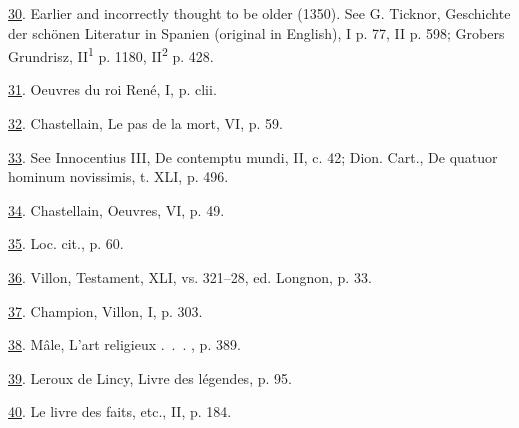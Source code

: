 \protect\hypertarget{23_NOTES.xhtmlux5cux23id_1293}{\protect\hyperlink{12_Chapter_Five__THE_VISION_OF_DEAT.xhtmlux5cux23id_1292}{30}}.
Earlier and incorrectly thought to be older (1350). See G. Ticknor,
Geschichte der schönen Literatur in Spanien (original in English), I p.
77, II p. 598; Grobers Grundrisz, II\textsuperscript{1} p. 1180,
II\textsuperscript{2} p. 428.

\protect\hypertarget{23_NOTES.xhtmlux5cux23id_1291}{\protect\hyperlink{12_Chapter_Five__THE_VISION_OF_DEAT.xhtmlux5cux23id_1290}{31}}.
Oeuvres du roi René, I, p. clii.

\protect\hypertarget{23_NOTES.xhtmlux5cux23id_1289}{\protect\hyperlink{12_Chapter_Five__THE_VISION_OF_DEAT.xhtmlux5cux23id_1288}{32}}.
Chastellain, Le pas de la mort, VI, p. 59.

\protect\hypertarget{23_NOTES.xhtmlux5cux23id_1287}{\protect\hyperlink{12_Chapter_Five__THE_VISION_OF_DEAT.xhtmlux5cux23id_1286}{33}}.
See Innocentius III, De contemptu mundi, II, c. 42; Dion. Cart., De
quatuor hominum novissimis, t. XLI, p. 496.

\protect\hypertarget{23_NOTES.xhtmlux5cux23id_1285}{\protect\hyperlink{12_Chapter_Five__THE_VISION_OF_DEAT.xhtmlux5cux23id_1284}{34}}.
Chastellain, Oeuvres, VI, p. 49.

\protect\hypertarget{23_NOTES.xhtmlux5cux23id_1283}{\protect\hyperlink{12_Chapter_Five__THE_VISION_OF_DEAT.xhtmlux5cux23id_1282}{35}}.
Loc. cit., p. 60.

\protect\hypertarget{23_NOTES.xhtmlux5cux23id_1281}{\protect\hyperlink{12_Chapter_Five__THE_VISION_OF_DEAT.xhtmlux5cux23id_1280}{36}}.
Villon, Testament, XLI, vs. 321--28, ed. Longnon, p. 33.

\protect\hypertarget{23_NOTES.xhtmlux5cux23id_1279}{\protect\hyperlink{12_Chapter_Five__THE_VISION_OF_DEAT.xhtmlux5cux23id_1278}{37}}.
Champion, Villon, I, p. 303.

\protect\hypertarget{23_NOTES.xhtmlux5cux23id_1277}{\protect\hyperlink{12_Chapter_Five__THE_VISION_OF_DEAT.xhtmlux5cux23id_1276}{38}}.
Mâle, L'art religieux .~.~. , p. 389.

\protect\hypertarget{23_NOTES.xhtmlux5cux23id_1275}{\protect\hyperlink{12_Chapter_Five__THE_VISION_OF_DEAT.xhtmlux5cux23id_1274}{39}}.
Leroux de Lincy, Livre des légendes, p. 95.

\protect\hypertarget{23_NOTES.xhtmlux5cux23id_42}{\protect\hyperlink{12_Chapter_Five__THE_VISION_OF_DEAT.xhtmlux5cux23id_41}{40}}.
Le livre des faits, etc., II, p. 184.

